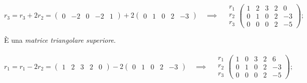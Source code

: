 \documentclass[a4paper]{report}
\begin{document}
        \paragraph{}
        $
                r_3 = r_3 + 2 r_2 = \begin{pmatrix}0 & -2 & 0 & -2 & 1\end{pmatrix} + 2 \begin{pmatrix}0 & 1 & 0 & 2 & -3\end{pmatrix}
                \quad \implies \quad
                \begin{matrix}r_1 \\ r_2 \\ r_3\end{matrix}
                \begin{pmatrix}
                        1 & 2 & 3 & 2  &  0 \\
                        0 & 1 & 0 & 2  & -3 \\
                        0 & 0 & 0 & 2  & -5
                \end{pmatrix};
        $

        \`{E} una \emph{matrice triangolare superiore}.

        \paragraph{}
        $
                r_1 = r_1 - 2 r_2 = \begin{pmatrix}1 & 2 & 3 & 2 & 0\end{pmatrix} - 2 \begin{pmatrix}0 & 1 & 0 & 2 & -3\end{pmatrix}
                \quad \implies \quad
                \begin{matrix}r_1 \\ r_2 \\ r_3\end{matrix}
                \begin{pmatrix}
                        1 & 0 & 3 & 2  &  6 \\
                        0 & 1 & 0 & 2  & -3 \\
                        0 & 0 & 0 & 2  & -5
                \end{pmatrix};
        $
\end{document}

